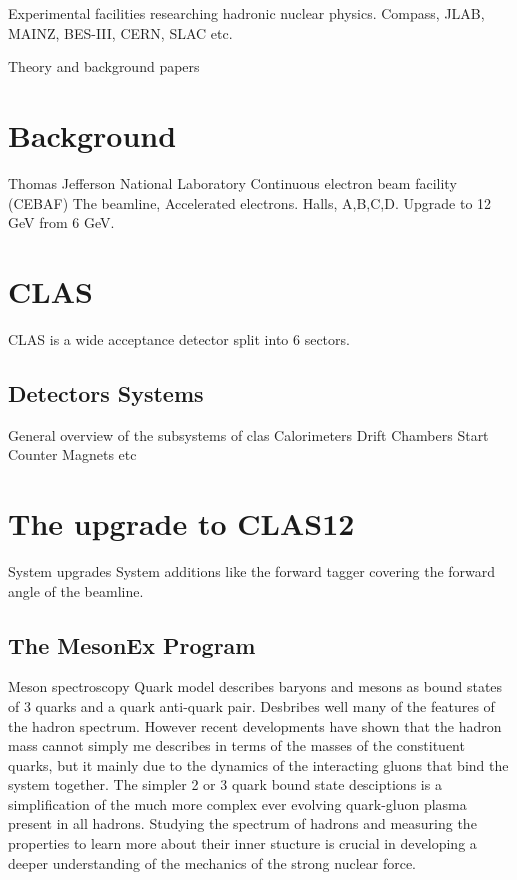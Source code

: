 Experimental facilities researching hadronic nuclear physics. Compass, JLAB, MAINZ, BES-III, CERN, SLAC etc. 

Theory and background papers
\cite{dudek2011lattice}
\cite{jaffe1977multiquark}
\cite{bali1993comprehensive}
\cite{johnson1975bag}
\cite{dombey1969scattering}
\cite{schilling1973analyse}

\section{Background}
Thomas Jefferson National Laboratory
Continuous electron beam facility (CEBAF)
The beamline, Accelerated electrons.
Halls, A,B,C,D.
Upgrade to 12 GeV from 6 GeV.


\section{CLAS}
CLAS is a wide acceptance detector split into 6 sectors.
\subsection{Detectors Systems}
General overview of the subsystems of clas
Calorimeters
Drift Chambers
Start Counter
Magnets
etc

\section{The upgrade to CLAS12}
System upgrades
System additions like the forward tagger covering the forward angle of the beamline.
\subsection{The MesonEx Program}
Meson spectroscopy
Quark model describes baryons and mesons as bound states of 3 quarks and a quark anti-quark pair. Desbribes well many of the features of the hadron spectrum. However recent developments have shown that the hadron mass cannot simply me describes in terms of the masses of the constituent quarks, but it mainly due to the dynamics of the interacting gluons that bind the system together. The simpler 2 or 3 quark bound state desciptions is a simplification of the much more complex ever evolving quark-gluon plasma present in all hadrons. Studying the spectrum of hadrons and measuring the properties to learn more about their inner stucture is crucial in developing a deeper understanding of the mechanics of the strong nuclear force.

